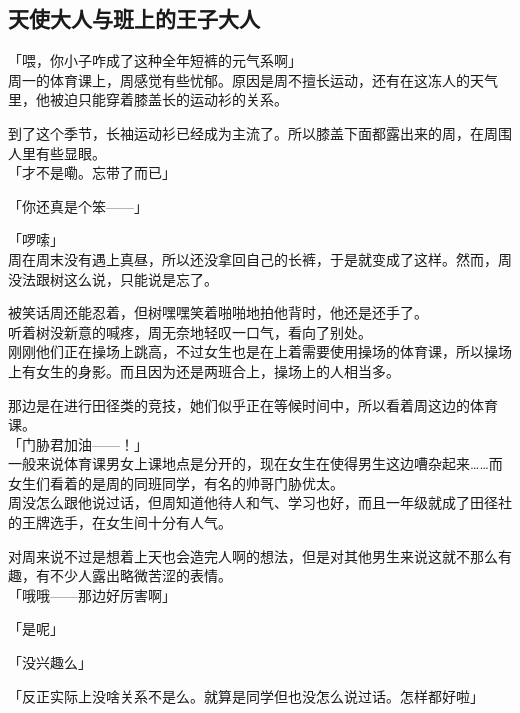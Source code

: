 \subsection{天使大人与班上的王子大人}

「喂，你小子咋成了这种全年短裤的元气系啊」\\

周一的体育课上，周感觉有些忧郁。原因是周不擅长运动，还有在这冻人的天气里，他被迫只能穿着膝盖长的运动衫的关系。

到了这个季节，长袖运动衫已经成为主流了。所以膝盖下面都露出来的周，在周围人里有些显眼。\\

「才不是嘞。忘带了而已」

「你还真是个笨——」

「啰嗦」\\

周在周末没有遇上真昼，所以还没拿回自己的长裤，于是就变成了这样。然而，周没法跟树这么说，只能说是忘了。

被笑话周还能忍着，但树嘿嘿笑着啪啪地拍他背时，他还是还手了。\\

听着树没新意的喊疼，周无奈地轻叹一口气，看向了别处。\\

刚刚他们正在操场上跳高，不过女生也是在上着需要使用操场的体育课，所以操场上有女生的身影。而且因为还是两班合上，操场上的人相当多。

那边是在进行田径类的竞技，她们似乎正在等候时间中，所以看着周这边的体育课。\\%

「门胁君加油——！」\\

一般来说体育课男女上课地点是分开的，现在女生在使得男生这边嘈杂起来……而女生们看着的是周的同班同学，有名的帅哥门胁优太。\\

周没怎么跟他说过话，但周知道他待人和气、学习也好，而且一年级就成了田径社的王牌选手，在女生间十分有人气。

对周来说不过是想着上天也会造完人啊的想法，但是对其他男生来说这就不那么有趣，有不少人露出略微苦涩的表情。\\

「哦哦——那边好厉害啊」

「是呢」

「没兴趣么」

「反正实际上没啥关系不是么。就算是同学但也没怎么说过话。怎样都好啦」\\

